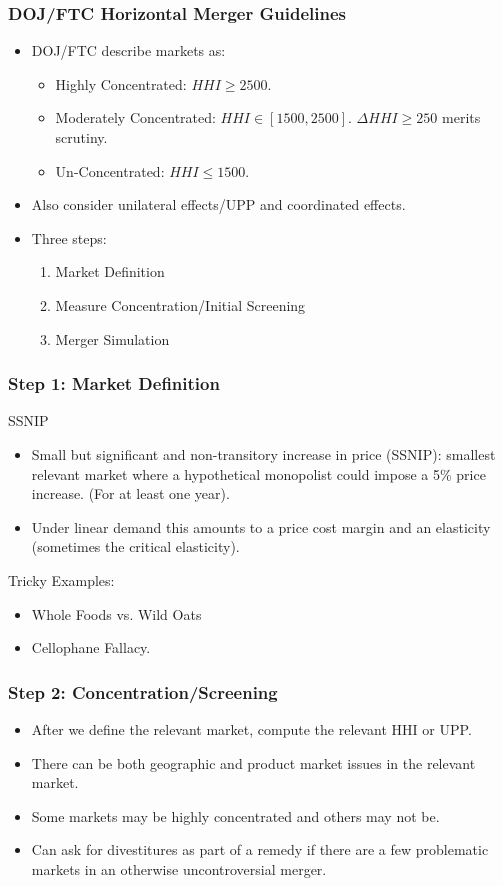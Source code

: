 \documentclass[xcolor=pdftex,dvipsnames,table,mathserif]{beamer}
\begin{document}
\begin{frame}
\frametitle{DOJ/FTC Horizontal Merger Guidelines}
 \begin{itemize}
\item DOJ/FTC describe markets as:
\begin{itemize}
\item Highly Concentrated: $HHI \geq 2500$.
\item Moderately Concentrated: $HHI \in [1500,2500]$. $\Delta HHI \geq 250$ merits scrutiny.
\item Un-Concentrated: $HHI \leq 1500$.
\end{itemize}
\item Also consider \alert{unilateral effects}/UPP and \alert{coordinated effects}.
\item Three steps:
\begin{enumerate}
\item Market Definition
\item Measure Concentration/Initial Screening
\item Merger Simulation
\end{enumerate}
 \end{itemize}
\end{frame}

\begin{frame}
\frametitle{Step 1: Market Definition}
SSNIP
 \begin{itemize}
\item Small but significant and non-transitory increase in price (SSNIP): smallest relevant market where a hypothetical monopolist could impose a 5\% price increase. (For at least one year).
\item Under linear demand this amounts to a price cost margin and an elasticity (sometimes the \alert{critical elasticity}).
 \end{itemize}
 Tricky Examples:
  \begin{itemize}
\item Whole Foods vs. Wild Oats
\item Cellophane Fallacy.
 \end{itemize}
\end{frame}

\begin{frame}
\frametitle{Step 2: Concentration/Screening}
 \begin{itemize}
\item After we define the relevant market, compute the relevant HHI or UPP.
\item There can be both geographic and product market issues in the relevant market.
\item Some markets may be highly concentrated and others may not be.
\item Can ask for \alert{divestitures} as part of a \alert{remedy} if there are a few problematic markets in an otherwise uncontroversial merger.
 \end{itemize}
\end{frame}
\end{document}
